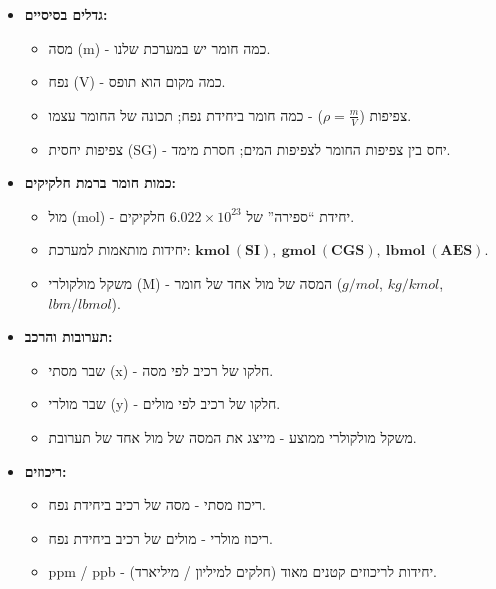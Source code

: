 \documentclass[
  hebrew,
  letterpaper,
  DIV=11,
  numbers=noendperiod]{scrreprt}
\providecommand{\tightlist}{%
  \setlength{\itemsep}{0pt}\setlength{\parskip}{0pt}}
\begin{document}
\begin{itemize}
\tightlist
\item
  \textbf{גדלים בסיסיים:}

  \begin{itemize}
  \tightlist
  \item
    מסה (m) - כמה חומר יש במערכת שלנו.\\
  \item
    נפח (V) - כמה מקום הוא תופס.\\
  \item
    צפיפות (\(\rho = \frac{m}{V}\)) - כמה חומר ביחידת נפח; תכונה של
    החומר עצמו.\\
  \item
    צפיפות יחסית (SG) - יחס בין צפיפות החומר לצפיפות המים; חסרת מימד.
  \end{itemize}
\item
  \textbf{כמות חומר ברמת חלקיקים:}

  \begin{itemize}
  \tightlist
  \item
    מול (mol) - יחידת ``ספירה'' של \(6.022 \times 10^{23}\) חלקיקים.\\
  \item
    יחידות מותאמות למערכת:
    \(\mathbf{kmol\ (SI)},\ \mathbf{gmol\ (CGS)},\ \mathbf{lbmol\ (AES)}\).\\
  \item
    משקל מולקולרי (M) - המסה של מול אחד של חומר (\(g/mol\), \(kg/kmol\),
    \(lbm/lbmol\)).
  \end{itemize}
\item
  \textbf{תערובות והרכב:}

  \begin{itemize}
  \tightlist
  \item
    שבר מסתי (x) - חלקו של רכיב לפי מסה.\\
  \item
    שבר מולרי (y) - חלקו של רכיב לפי מולים.\\
  \item
    משקל מולקולרי ממוצע - מייצג את המסה של מול אחד של תערובת.
  \end{itemize}
\item
  \textbf{ריכוזים:}

  \begin{itemize}
  \tightlist
  \item
    ריכוז מסתי - מסה של רכיב ביחידת נפח.\\
  \item
    ריכוז מולרי - מולים של רכיב ביחידת נפח.\\
  \item
    ppm / ppb - יחידות לריכוזים קטנים מאוד (חלקים למיליון / מיליארד).
  \end{itemize}
\end{itemize}
\end{document}
